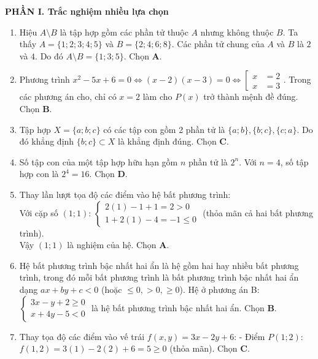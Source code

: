 \documentclass[12pt,a4paper]{article}
\begin{document}
\textbf{PHẦN I. Trắc nghiệm nhiều lựa chọn}
\begin{enumerate}
\item Hiệu $A \setminus B$ là tập hợp gồm các phần tử thuộc $A$ nhưng không thuộc $B$.
Ta thấy $A = \{1; 2; 3; 4; 5\}$ và $B = \{2; 4; 6; 8\}$. Các phần tử chung của $A$ và $B$ là $2$ và $4$.
Do đó $A \setminus B = \{1; 3; 5\}$. Chọn \textbf{A}.

\item Phương trình $x^2 - 5x + 6 = 0 \iff (x - 2)(x - 3) = 0 \iff \left[\begin{aligned} x &= 2 \\ x &= 3 \end{aligned}\right.$.
Trong các phương án cho, chỉ có $x = 2$ làm cho $P(x)$ trở thành mệnh đề đúng. Chọn \textbf{B}.

\item Tập hợp $X = \{a; b; c\}$ có các tập con gồm 2 phần tử là $\{a; b\}, \{b; c\}, \{c; a\}$.
Do đó khẳng định $\{b; c\} \subset X$ là khẳng định đúng. Chọn \textbf{C}.

\item Số tập con của một tập hợp hữu hạn gồm $n$ phần tử là $2^n$. Với $n = 4$, số tập hợp con là $2^4 = 16$. Chọn \textbf{D}.

\item Thay lần lượt tọa độ các điểm vào hệ bất phương trình:\\
Với cặp số $(1; 1)$: $\begin{cases} 2(1) - 1 + 1 = 2 > 0 \\ 1 + 2(1) - 4 = -1 \le 0 \end{cases}$ (thỏa mãn cả hai bất phương trình).\\
Vậy $(1; 1)$ là nghiệm của hệ. Chọn \textbf{A}.

\item Hệ bất phương trình bậc nhất hai ẩn là hệ gồm hai hay nhiều bất phương trình, trong đó mỗi bất phương trình là bất phương trình bậc nhất hai ẩn dạng $ax + by + c < 0$ (hoặc $\le 0, > 0, \ge 0$).
Hệ ở phương án B: $\begin{cases} 3x - y + 2 \ge 0 \\ x + 4y - 5 < 0 \end{cases}$ là hệ bất phương trình bậc nhất hai ẩn. Chọn \textbf{B}.

\item Thay tọa độ các điểm vào vế trái $f(x, y) = 3x - 2y + 6$:
- Điểm $P(1; 2)$: $f(1, 2) = 3(1) - 2(2) + 6 = 5 \ge 0$ (thỏa mãn). Chọn \textbf{C}.


\end{enumerate}
\end{document}
